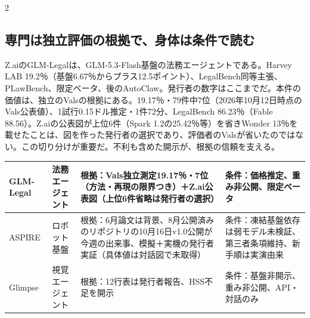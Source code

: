 \documentclass[lualatex,a4paper,10pt]{jlreq}
\begin{document}
\begin{multicols}{2}
\subsection*{専門は独立評価の根拠で、身体は条件で読む}

Z.aiのGLM-Legalは、GLM-5.3-Flash基盤の法務エージェントである。Harvey LAB 19.2％（基盤6.67％からプラス12.5ポイント）、LegalBench同等主張、PLawBench、限定ベータ、後のAutoClaw。発行者の数字はここまでだ。本件の価値は、独立のValsの根拠にある。19.17％・79件中7位（2026年10月12日時点のVals公表値）、1試行0.15ドル推定・1件72分、LegalBench 86.23％（Fable 88.56）。Z.aiの公表図が上位6件（Spark 1.2の25.42％等）を省きWonder 13％を載せたことは、図を作った発行者の選択であり、評価者のValsが省いたのではない。この切り分けが重要だ。不利も含めた開示が、根拠の信頼を支える。
\cite{B55,B53,B54}

\end{multicols} %

{\centering\footnotesize
{}
\begin{tabularx}{0.96\linewidth}{@{}lXXX@{}}
\toprule
GLM-Legal & 法務エージェント & 根拠：Vals独立測定19.17％・7位（方法・再現の限界つき）＋Z.ai公表図（上位6件省略は発行者の選択） & 条件：価格推定、重み非公開、限定ベータ \cite{B55,B53,B54} \\
\midrule
ASPIRE & ロボット基盤 & 根拠：6月論文は背景、8月公開済みのリポジトリの10月16日v1.0公開が今週の出来事、模擬＋実機の発行者実証（具体値は対話図で未取得） & 条件：凍結基盤依存は弱モデル未検証、第三者条項維持、新手順は実演由来 \cite{B57,B56,B89} \\
\midrule
Glimpse & 視覚エージェント & 根拠：12行表は発行者報告、HSS不足を開示 & 条件：基盤非開示、重み非公開、API・対話のみ \cite{B58,B59,B88} \\
\bottomrule
\end{tabularx}
} %
\end{document}
